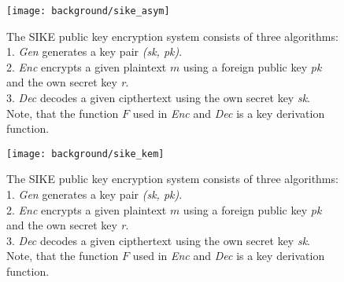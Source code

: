 \begin{figure}[htpb]
  \centering
  \texttt{[image: background/sike\_asym]}
  \caption[SIKE public key encryption]
  {The SIKE public key encryption system consists of three algorithms: 
  \\
  1. \textit{Gen} generates a key pair \textit{(sk, pk)}.
  \\
  2. \textit{Enc} encrypts a given plaintext $m$ using a foreign public key \textit{pk} and the own secret key \textit{r}.
  \\
  3. \textit{Dec} decodes a given cipthertext using the own secret key \textit{sk}.
  \\ Note, that the function $F$ used in \textit{Enc} and \textit{Dec} is a key derivation function.} \label{fig:sike-sidh}
\end{figure}

\begin{figure}[htpb]
  \centering
  \texttt{[image: background/sike\_kem]}
  \caption[SIKE public key encryption]
  {The SIKE public key encryption system consists of three algorithms: 
  \\
  1. \textit{Gen} generates a key pair \textit{(sk, pk)}.
  \\
  2. \textit{Enc} encrypts a given plaintext $m$ using a foreign public key \textit{pk} and the own secret key \textit{r}.
  \\
  3. \textit{Dec} decodes a given cipthertext using the own secret key \textit{sk}.
  \\ Note, that the function $F$ used in \textit{Enc} and \textit{Dec} is a key derivation function.} \label{fig:sike-sidh}
\end{figure}
